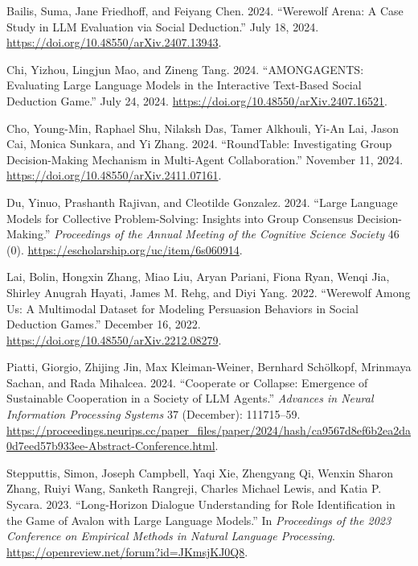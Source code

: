\documentclass[
  letterpaper,
  DIV=11,
  numbers=noendperiod,
  oneside]{scrreprt}
\newlength{\cslhangindent}
\newenvironment{CSLReferences}[2] %
 {\begin{list}{}{%
  \setlength{\itemindent}{0pt}
  \setlength{\leftmargin}{0pt}
  \setlength{\parsep}{0pt}
  \ifodd #1
   \setlength{\leftmargin}{\cslhangindent}
   \setlength{\itemindent}{-1\cslhangindent}
  \fi
  \setlength{\itemsep}{#2\baselineskip}}}
 {\end{list}}
\begin{document}
\label{refs}
\begin{CSLReferences}{1}{0}
Bailis, Suma, Jane Friedhoff, and Feiyang Chen. 2024. {``Werewolf
{Arena}: {A Case Study} in {LLM Evaluation} via {Social Deduction}.''}
July 18, 2024. \url{https://doi.org/10.48550/arXiv.2407.13943}.

Chi, Yizhou, Lingjun Mao, and Zineng Tang. 2024. {``{AMONGAGENTS}:
{Evaluating Large Language Models} in the {Interactive Text-Based Social
Deduction Game}.''} July 24, 2024.
\url{https://doi.org/10.48550/arXiv.2407.16521}.

Cho, Young-Min, Raphael Shu, Nilaksh Das, Tamer Alkhouli, Yi-An Lai,
Jason Cai, Monica Sunkara, and Yi Zhang. 2024. {``{RoundTable}:
{Investigating Group Decision-Making Mechanism} in {Multi-Agent
Collaboration}.''} November 11, 2024.
\url{https://doi.org/10.48550/arXiv.2411.07161}.

Du, Yinuo, Prashanth Rajivan, and Cleotilde Gonzalez. 2024. {``Large
{Language Models} for {Collective Problem-Solving}: {Insights} into
{Group Consensus Decision-Making}.''} \emph{Proceedings of the Annual
Meeting of the Cognitive Science Society} 46 (0).
\url{https://escholarship.org/uc/item/6s060914}.

Lai, Bolin, Hongxin Zhang, Miao Liu, Aryan Pariani, Fiona Ryan, Wenqi
Jia, Shirley Anugrah Hayati, James M. Rehg, and Diyi Yang. 2022.
{``Werewolf {Among Us}: {A Multimodal Dataset} for {Modeling Persuasion
Behaviors} in {Social Deduction Games}.''} December 16, 2022.
\url{https://doi.org/10.48550/arXiv.2212.08279}.

Piatti, Giorgio, Zhijing Jin, Max Kleiman-Weiner, Bernhard Schölkopf,
Mrinmaya Sachan, and Rada Mihalcea. 2024. {``Cooperate or {Collapse}:
{Emergence} of {Sustainable Cooperation} in a {Society} of {LLM
Agents}.''} \emph{Advances in Neural Information Processing Systems} 37
(December): 111715--59.
\url{https://proceedings.neurips.cc/paper_files/paper/2024/hash/ca9567d8ef6b2ea2da0d7eed57b933ee-Abstract-Conference.html}.

Stepputtis, Simon, Joseph Campbell, Yaqi Xie, Zhengyang Qi, Wenxin
Sharon Zhang, Ruiyi Wang, Sanketh Rangreji, Charles Michael Lewis, and
Katia P. Sycara. 2023. {``Long-Horizon Dialogue Understanding for Role
Identification in the Game of Avalon with Large Language Models.''} In
\emph{Proceedings of the 2023 Conference on Empirical Methods in Natural
Language Processing}. \url{https://openreview.net/forum?id=JKmsjKJ0Q8}.


\end{CSLReferences}
\end{document}
